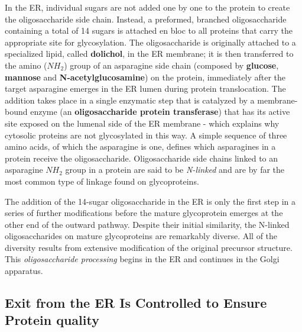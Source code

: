 In the ER, individual sugars are not added one by one to the protein to
create the oligosaccharide side chain. Instead, a preformed, branched
oligosaccharide containing a total of 14 sugars is attached en bloc to all
proteins that carry the appropriate site for glycosylation. The oligosaccharide 
is originally attached to a specialized lipid, called \textbf{dolichol}, in the
ER membrane; it is then transferred to the amino ($NH_2$) group of an asparagine 
side chain (composed by \textbf{glucose}, \textbf{mannose} and \textbf{N-acetylglucosamine}) 
on the protein, immediately after the target asparagine
emerges in the ER lumen during protein translocation. The
addition takes place in a single enzymatic step that is catalyzed by a
membrane-bound enzyme (an \textbf{oligosaccharide protein transferase}) that
has its active site exposed on the lumenal side of the ER membrane - 
which explains why cytosolic proteins are not glycosylated in this way.
A simple sequence of three amino acids, of which the asparagine is
one, defines which asparagines in a protein receive the oligosaccharide.
Oligosaccharide side chains linked to an asparagine $NH_2$ group in a protein 
are said to be \textit{N-linked} and are by far the most common type of
linkage found on glycoproteins.

The addition of the 14-sugar oligosaccharide in the ER is only the first
step in a series of further modifications before the mature glycoprotein
emerges at the other end of the outward pathway. Despite their initial
similarity, the N-linked oligosaccharides on mature glycoproteins are
remarkably diverse. All of the diversity results from extensive modification 
of the original precursor structure. This
\textit{oligosaccharide processing} begins in the ER and continues in the Golgi
apparatus.

\subsection{Exit from the ER Is Controlled to Ensure Protein quality}

